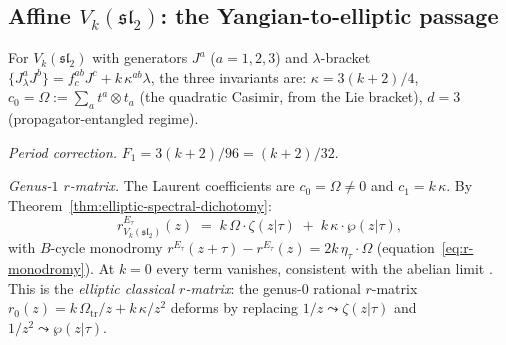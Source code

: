 \subsection{Affine $V_k(\mathfrak{sl}_2)$:
 the Yangian-to-elliptic passage}%
\label{subsec:affine-genus1-endomorphism}

\begin{computation}%
\label{comp:affine-sl2-genus1-endomorphism}%
%
%
%
For $V_k(\mathfrak{sl}_2)$ with generators
$J^a$ ($a = 1,2,3$) and $\lambda$-bracket
$\{J^a_\lambda J^b\} = f^{ab}_c J^c + k\,\kappa^{ab}\lambda$,
the three invariants are:
$\kappa = 3(k+2)/4$,
$c_0 = \Omega := \sum_a t^a \otimes t_a$ \textup{(}the
quadratic Casimir, from the Lie bracket\textup{)},
$d = 3$ \textup{(}propagator-entangled regime\textup{)}.

\smallskip
\noindent
\emph{Period correction.}
$F_1 = 3(k+2)/96 = (k+2)/32$.

\smallskip
\noindent
\emph{Genus-$1$ $r$-matrix.}
The Laurent coefficients are $c_0 = \Omega \ne 0$
and $c_1 = k\,\kappa$. By
Theorem~\ref{thm:elliptic-spectral-dichotomy}:
\begin{equation}\label{eq:affine-genus1-rmatrix}
r^{E_\tau}_{V_k(\mathfrak{sl}_2)}(z)
\;=\;
k\,\Omega \cdot \zeta(z|\tau)
\;+\;
k\,\kappa \cdot \wp(z|\tau),
\end{equation}
with $B$-cycle monodromy
$r^{E_\tau}(z + \tau) - r^{E_\tau}(z) = 2k\,\eta_\tau \cdot \Omega$
(equation~\eqref{eq:r-monodromy}). At $k = 0$ every
term vanishes, consistent with the abelian limit
. This is the
\emph{elliptic classical $r$-matrix}: the genus-$0$
rational $r$-matrix $r_0(z) = k\,\Omega_{\mathrm{tr}}/z + k\,\kappa/z^2$
deforms by replacing $1/z \leadsto \zeta(z|\tau)$ and
$1/z^2 \leadsto \wp(z|\tau)$.


\end{computation}
